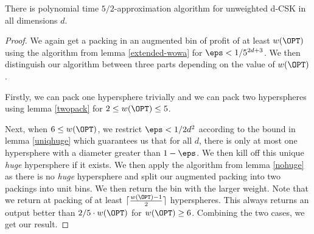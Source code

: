 \begin{theorem}
	There is polynomial time $5/2$-approximation algorithm for unweighted d-CSK in all dimensions $d$.
\end{theorem}
\begin{proof}
	We again get a packing in an augmented bin of profit of at least $w(\OPT)$ using the algorithm from lemma \ref{extended-wowa} for $\eps< 1/5^{2d+3}$. We then distinguish our algorithm between three parts depending on the value of $w(\OPT)$.
	
	Firstly, we can pack one hypersphere trivially and we can pack two hyperspheres using lemma \ref{twopack} for $2\leq w(\OPT)\leq 5$. 
	
	Next, when $6 \leq w(\OPT)$, we restrict $\eps<1/2d^2$ according to the bound in lemma \ref{uniqhuge} which guarantees us that for all $d$, there is only at most one hypersphere with a diameter greater than $1-\eps$. We then kill off this unique \textit{huge} hypersphere if it exists. We then apply the algorithm from lemma \ref{nohuge} as there is no \textit{huge} hypersphere and split our augmented packing into two packings into unit bins. We then return the bin with the larger weight. Note that we return at packing of at least $\lceil \frac{w(\OPT)-1}{2} \rceil$ hyperspheres. This always returns an output better than $2/5 \cdot w(\OPT)$ for $w(\OPT)\geq 6$. Combining the two cases, we get our result.
	
\end{proof}
